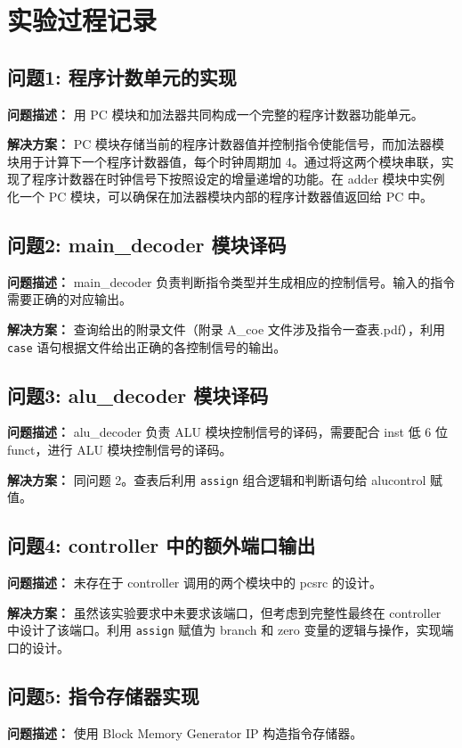\section{实验过程记录}

\subsection{问题1: 程序计数单元的实现}
\textbf{问题描述：} 用 PC 模块和加法器共同构成一个完整的程序计数器功能单元。

\textbf{解决方案：} PC 模块存储当前的程序计数器值并控制指令使能信号，而加法器模块用于计算下一个程序计数器值，每个时钟周期加 4。通过将这两个模块串联，实现了程序计数器在时钟信号下按照设定的增量递增的功能。在 adder 模块中实例化一个 PC 模块，可以确保在加法器模块内部的程序计数器值返回给 PC 中。

\subsection{问题2: main\_decoder 模块译码}
\textbf{问题描述：} main\_decoder 负责判断指令类型并生成相应的控制信号。输入的指令需要正确的对应输出。

\textbf{解决方案：} 查询给出的附录文件（附录 A\_coe 文件涉及指令一查表.pdf），利用 \texttt{case} 语句根据文件给出正确的各控制信号的输出。

\subsection{问题3: alu\_decoder 模块译码}
\textbf{问题描述：} alu\_decoder 负责 ALU 模块控制信号的译码，需要配合 inst 低 6 位 funct，进行 ALU 模块控制信号的译码。

\textbf{解决方案：} 同问题 2。查表后利用 \texttt{assign} 组合逻辑和判断语句给 alucontrol 赋值。

\subsection{问题4: controller 中的额外端口输出}
\textbf{问题描述：} 未存在于 controller 调用的两个模块中的 pcsrc 的设计。

\textbf{解决方案：} 虽然该实验要求中未要求该端口，但考虑到完整性最终在 controller 中设计了该端口。利用 \texttt{assign} 赋值为 branch 和 zero 变量的逻辑与操作，实现端口的设计。

\subsection{问题5: 指令存储器实现}
\textbf{问题描述：} 使用 Block Memory Generator IP 构造指令存储器。

